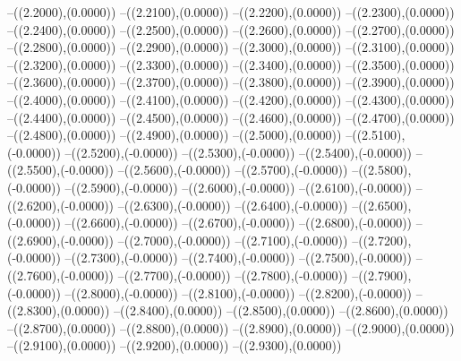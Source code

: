 {	--({\sx*(2.2000)},{\sy*(0.0000)})
	--({\sx*(2.2100)},{\sy*(0.0000)})
	--({\sx*(2.2200)},{\sy*(0.0000)})
	--({\sx*(2.2300)},{\sy*(0.0000)})
	--({\sx*(2.2400)},{\sy*(0.0000)})
	--({\sx*(2.2500)},{\sy*(0.0000)})
	--({\sx*(2.2600)},{\sy*(0.0000)})
	--({\sx*(2.2700)},{\sy*(0.0000)})
	--({\sx*(2.2800)},{\sy*(0.0000)})
	--({\sx*(2.2900)},{\sy*(0.0000)})
	--({\sx*(2.3000)},{\sy*(0.0000)})
	--({\sx*(2.3100)},{\sy*(0.0000)})
	--({\sx*(2.3200)},{\sy*(0.0000)})
	--({\sx*(2.3300)},{\sy*(0.0000)})
	--({\sx*(2.3400)},{\sy*(0.0000)})
	--({\sx*(2.3500)},{\sy*(0.0000)})
	--({\sx*(2.3600)},{\sy*(0.0000)})
	--({\sx*(2.3700)},{\sy*(0.0000)})
	--({\sx*(2.3800)},{\sy*(0.0000)})
	--({\sx*(2.3900)},{\sy*(0.0000)})
	--({\sx*(2.4000)},{\sy*(0.0000)})
	--({\sx*(2.4100)},{\sy*(0.0000)})
	--({\sx*(2.4200)},{\sy*(0.0000)})
	--({\sx*(2.4300)},{\sy*(0.0000)})
	--({\sx*(2.4400)},{\sy*(0.0000)})
	--({\sx*(2.4500)},{\sy*(0.0000)})
	--({\sx*(2.4600)},{\sy*(0.0000)})
	--({\sx*(2.4700)},{\sy*(0.0000)})
	--({\sx*(2.4800)},{\sy*(0.0000)})
	--({\sx*(2.4900)},{\sy*(0.0000)})
	--({\sx*(2.5000)},{\sy*(0.0000)})
	--({\sx*(2.5100)},{\sy*(-0.0000)})
	--({\sx*(2.5200)},{\sy*(-0.0000)})
	--({\sx*(2.5300)},{\sy*(-0.0000)})
	--({\sx*(2.5400)},{\sy*(-0.0000)})
	--({\sx*(2.5500)},{\sy*(-0.0000)})
	--({\sx*(2.5600)},{\sy*(-0.0000)})
	--({\sx*(2.5700)},{\sy*(-0.0000)})
	--({\sx*(2.5800)},{\sy*(-0.0000)})
	--({\sx*(2.5900)},{\sy*(-0.0000)})
	--({\sx*(2.6000)},{\sy*(-0.0000)})
	--({\sx*(2.6100)},{\sy*(-0.0000)})
	--({\sx*(2.6200)},{\sy*(-0.0000)})
	--({\sx*(2.6300)},{\sy*(-0.0000)})
	--({\sx*(2.6400)},{\sy*(-0.0000)})
	--({\sx*(2.6500)},{\sy*(-0.0000)})
	--({\sx*(2.6600)},{\sy*(-0.0000)})
	--({\sx*(2.6700)},{\sy*(-0.0000)})
	--({\sx*(2.6800)},{\sy*(-0.0000)})
	--({\sx*(2.6900)},{\sy*(-0.0000)})
	--({\sx*(2.7000)},{\sy*(-0.0000)})
	--({\sx*(2.7100)},{\sy*(-0.0000)})
	--({\sx*(2.7200)},{\sy*(-0.0000)})
	--({\sx*(2.7300)},{\sy*(-0.0000)})
	--({\sx*(2.7400)},{\sy*(-0.0000)})
	--({\sx*(2.7500)},{\sy*(-0.0000)})
	--({\sx*(2.7600)},{\sy*(-0.0000)})
	--({\sx*(2.7700)},{\sy*(-0.0000)})
	--({\sx*(2.7800)},{\sy*(-0.0000)})
	--({\sx*(2.7900)},{\sy*(-0.0000)})
	--({\sx*(2.8000)},{\sy*(-0.0000)})
	--({\sx*(2.8100)},{\sy*(-0.0000)})
	--({\sx*(2.8200)},{\sy*(-0.0000)})
	--({\sx*(2.8300)},{\sy*(0.0000)})
	--({\sx*(2.8400)},{\sy*(0.0000)})
	--({\sx*(2.8500)},{\sy*(0.0000)})
	--({\sx*(2.8600)},{\sy*(0.0000)})
	--({\sx*(2.8700)},{\sy*(0.0000)})
	--({\sx*(2.8800)},{\sy*(0.0000)})
	--({\sx*(2.8900)},{\sy*(0.0000)})
	--({\sx*(2.9000)},{\sy*(0.0000)})
	--({\sx*(2.9100)},{\sy*(0.0000)})
	--({\sx*(2.9200)},{\sy*(0.0000)})
	--({\sx*(2.9300)},{\sy*(0.0000)})
}
